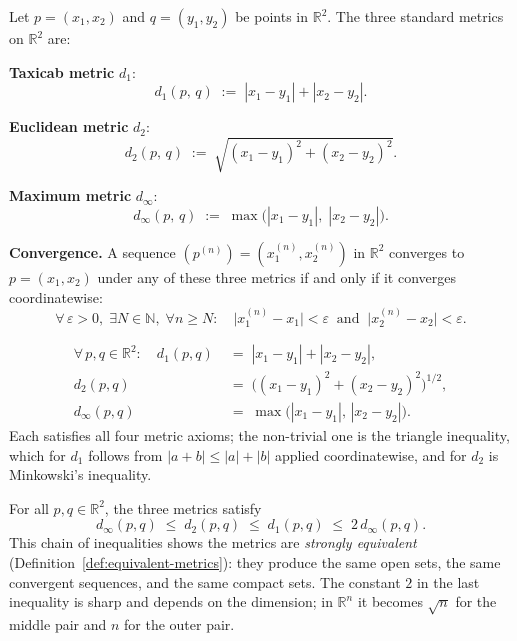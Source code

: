 \begin{tcolorbox}[colback=propbox, colframe=propborder, arc=2pt,
  left=6pt, right=6pt, top=4pt, bottom=4pt,
  title={\small\textbf{Definition ($\mathbb{R}^2$ with Three Standard Metrics)}},
  fonttitle=\small\bfseries]
\begin{definition}
\label{def:r2-three-metrics}
Let $p = (x_1, x_2)$ and $q = (y_1, y_2)$ be points in $\mathbb{R}^2$.
The three standard metrics on $\mathbb{R}^2$ are:

\medskip
\noindent\textbf{Taxicab metric} $d_1$:
\[
d_1(p,\,q) \;:=\; |x_1 - y_1| + |x_2 - y_2|.
\]

\noindent\textbf{Euclidean metric} $d_2$:
\[
d_2(p,\,q) \;:=\; \sqrt{(x_1-y_1)^2 + (x_2-y_2)^2}.
\]

\noindent\textbf{Maximum metric} $d_\infty$:
\[
d_\infty(p,\,q) \;:=\; \max\bigl(|x_1 - y_1|,\; |x_2 - y_2|\bigr).
\]

\medskip
\noindent\textbf{Convergence.}\quad
A sequence $(p^{(n)}) = (x_1^{(n)}, x_2^{(n)})$ in $\mathbb{R}^2$
converges to $p = (x_1, x_2)$ under any of these three metrics if and
only if it converges coordinatewise:
\[
\forall\,\varepsilon > 0,\;\exists N \in \mathbb{N},\;
\forall n \ge N:\quad
\bigl|x_1^{(n)} - x_1\bigr| < \varepsilon
\;\;\text{and}\;\;
\bigl|x_2^{(n)} - x_2\bigr| < \varepsilon.
\]
\end{definition}
\end{tcolorbox}

\begin{remark*}
\begin{align*}
\forall\, p,q \in \mathbb{R}^2: \quad
d_1(p,q) &\;=\; |x_1-y_1| + |x_2-y_2|, \\
d_2(p,q) &\;=\; \bigl((x_1-y_1)^2 + (x_2-y_2)^2\bigr)^{1/2}, \\
d_\infty(p,q) &\;=\; \max\bigl(|x_1-y_1|,\,|x_2-y_2|\bigr).
\end{align*}
Each satisfies all four metric axioms; the non-trivial one is the triangle
inequality, which for $d_1$ follows from $|a+b| \le |a|+|b|$ applied
coordinatewise, and for $d_2$ is Minkowski's inequality.
\end{remark*}

\begin{remark*}
For all $p, q \in \mathbb{R}^2$, the three metrics satisfy
\[
d_\infty(p,q)
\;\le\;
d_2(p,q)
\;\le\;
d_1(p,q)
\;\le\;
2\,d_\infty(p,q).
\]
This chain of inequalities shows the metrics are \emph{strongly equivalent}
(Definition~\ref{def:equivalent-metrics}): they produce the same open sets,
the same convergent sequences, and the same compact sets.
The constant $2$ in the last inequality is sharp and depends on the
dimension; in $\mathbb{R}^n$ it becomes $\sqrt{n}$ for the middle pair
and $n$ for the outer pair.
\end{remark*}

